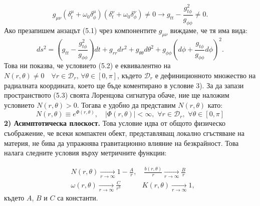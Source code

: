 \begin{equation}
g_{\mu\nu} (\delta_t^\mu + \omega_0\delta^\mu_\phi) (\delta_t^\nu + \omega_0\delta^\nu_\phi) \ne 0 \rightarrow g_{tt} - \frac{g_{t\phi}^2}{g_{\phi\phi}} \ne 0.
\end{equation}\newline
Ако презапишем анзацът (5.1) чрез компонентите $g_{\mu\nu}$ виждаме, че тя има вида:
\begin{equation}
	ds^2 = \left(g_{tt} - \frac{g_{t\phi}^2}{g_{\phi\phi}}\right)dt + g_{rr}dr^2 + g_{\theta\theta}d\theta^2 + g_{\phi\phi}\left(d\phi + \frac{g_{t\phi}}{g_{\phi\phi}}d\phi\right)^2.
\end{equation}
Това ни показва, че условието (5.2) е еквивалентно на $N(r,\theta)\ne 0\quad \forall r\in\mathcal{D}_r,\,\forall \theta\in[0,\pi]$, където $\mathcal{D}_r$ е дефиниционното множество на радиалната координата, което ще бъде коментирано в условие 3). За да запази пространството (5.3) своята Лоренцова сигнатура обаче, ние ще наложим условието $N(r,\theta) > 0$. Тогава е удобно да представим $N(r,\theta)$ като:
\begin{equation}
	N(r,\theta) \equiv e^{\Phi(r,\theta)}, \quad |\Phi(r,\theta)| < \infty,\,\, \forall r\in\mathcal{D}_r,\,\,\forall\theta\in[0,\pi]
\end{equation}
\textbf{2) Асимптотическа плоскост.} Това условие идва от общото физическо съображение, че всеки компактен обект, представляващ локално сгъстяване на материя, не бива да упражнява гравитационно влияние на безкрайност. Това налага следните условия върху метричните функции:

\begin{equation}
	\begin{aligned}
		&N(r,\theta) \xrightarrow[r\rightarrow\infty]{} 1 - \frac{A}{r},\quad \frac{b(r,\theta)}{r} \xrightarrow[r\rightarrow\infty]{} \frac{B}{r} \\
		&\omega(r,\theta)\xrightarrow[r\rightarrow\infty]{} \frac{C}{r^3}\quad\qquad  K(r,\theta) \xrightarrow[r\rightarrow\infty]{} 1,
	\end{aligned}
\end{equation}
където $A$, $B$ и $C$ са константи.

